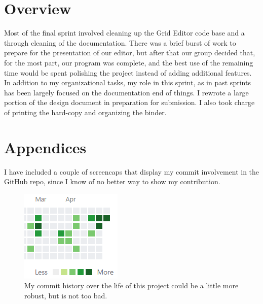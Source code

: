\documentclass[letterpaper,12pt]{texMemo}
\begin{document}
\maketitle

\section*{ Overview }

Most of the final sprint involved cleaning up the Grid Editor code base and a through cleaning of the documentation. There was a brief burst of work to prepare for the presentation of our editor, but after that our group decided that, for the most part, our program was complete, and the best use of the remaining time would be spent polishing the project instead of adding additional features.
\\
In addition to my organizational tasks, my role in this sprint, as in past sprints has been largely focused on the documentation end of things. I rewrote a large portion of the design document in preparation for submission. I also took charge of printing the hard-copy and organizing the binder.


\section*{ Appendices }

I have included a couple of screencaps that display my commit involvement in the GitHub repo, since I know of no better way to show my contribution.

\begin{figure}[h]
  \centering
  \includegraphics[width=.4\linewidth]{git_contrib} 
  \caption{
    My commit history over the life of this project could be a little more robust, but is not too bad.
  }
\end{figure}
\end{document}
